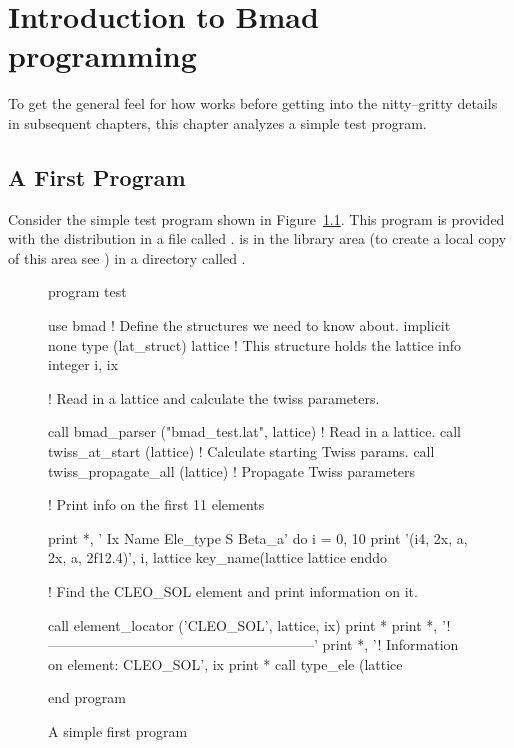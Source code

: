 \chapter{Introduction to Bmad programming}
\label{c:program_info}

To get the general feel for how \bmad works before
getting into the nitty--gritty details in subsequent chapters, this
chapter analyzes a simple test program.

\section{A First Program}

Consider the simple test program shown in Figure~\ref{f:program}.
This program is provided with the \bmad distribution in a file called
.  is in the  library area (to
create a local copy of this area see ) in a directory
called .

\begin{figure}[ht]
\begin{listing}{1}
program test

  use bmad                 ! Define the structures we need to know about.
  implicit none
  type (lat_struct) lattice  ! This structure holds the lattice info
  integer i, ix

! Read in a lattice and calculate the twiss parameters.

  call bmad_parser ("bmad_test.lat", lattice)    ! Read in a lattice.
  call twiss_at_start (lattice)           ! Calculate starting Twiss params.
  call twiss_propagate_all (lattice)      ! Propagate Twiss parameters

! Print info on the first 11 elements

  print *, ' Ix  Name              Ele_type                   S      Beta_a'
  do i = 0, 10
    print '(i4, 2x, a, 2x, a, 2f12.4)', i, lattice%
                    key_name(lattice%
                    lattice%
  enddo

! Find the CLEO_SOL element and print information on it.

  call element_locator ('CLEO_SOL', lattice, ix)
  print *
  print *, '!---------------------------------------------------------'
  print *, '! Information on element: CLEO_SOL', ix
  print *
  call type_ele (lattice%

end program
\end{listing}
\caption{A simple first program}
\label{f:program}
\end{figure}

